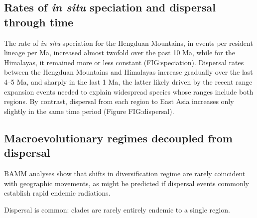 \subsection{Rates of \textit{in situ} speciation and dispersal through time}

The rate of \textit{in situ} speciation for the Hengduan Mountains, in events per resident lineage per Ma, increased almost twofold over the past 10 Ma, while for the Himalayas, it remained more or less constant (FIG:speciation). Dispersal rates between the Hengduan Mountains and Himalayas increase gradually over the last 4--5 Ma, and sharply in the last 1 Ma, the latter likely driven by the recent range expansion events needed to explain widespread species whose ranges include both regions. By contrast, dispersal from each region to East Asia increases only slightly in the same time period (Figure FIG:dispersal).

\subsection{Macroevolutionary regimes decoupled from dispersal}

BAMM analyses show that shifts in diversification regime are rarely coincident with geographic movements, as might be predicted if dispersal events commonly establish rapid endemic radiations.

Dispersal is common: clades are rarely entirely endemic to a single region.